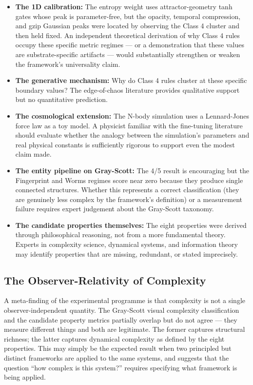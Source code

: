 \documentclass[12pt,a4paper]{article}
\begin{document}
\begin{itemize}[noitemsep]
  \item \textbf{The 1D calibration:} The entropy weight uses attractor-geometry
    tanh gates whose peak is parameter-free, but the opacity, temporal
    compression, and gzip Gaussian peaks were located by observing the
    Class 4 cluster and then held fixed.
    An independent theoretical derivation of why Class 4 rules occupy
    these specific metric regimes — or a demonstration that these values
    are substrate-specific artifacts — would substantially strengthen or
    weaken the framework's universality claim.
  \item \textbf{The generative mechanism:} Why do Class 4 rules cluster
    at these specific boundary values? The edge-of-chaos literature
    \citep{langton1990} provides qualitative support but no quantitative
    prediction.
  \item \textbf{The cosmological extension:} The N-body simulation uses
    a Lennard-Jones force law as a toy model. A physicist familiar with
    the fine-tuning literature should evaluate whether the analogy between
    the simulation's parameters and real physical constants is sufficiently
    rigorous to support even the modest claim made.
  \item \textbf{The entity pipeline on Gray-Scott:} The 4/5 result is
    encouraging but the Fingerprint and Worms regimes score near zero
    because they produce single connected structures. Whether this
    represents a correct classification (they are genuinely less complex
    by the framework's definition) or a measurement failure requires
    expert judgement about the Gray-Scott taxonomy.
  \item \textbf{The candidate properties themselves:} The eight properties were
    derived through philosophical reasoning, not from a more fundamental
    theory. Experts in complexity science, dynamical systems, and
    information theory may identify properties that are missing,
    redundant, or stated imprecisely.
\end{itemize}

\subsection{The Observer-Relativity of Complexity}

A meta-finding of the experimental programme is that complexity is not
a single observer-independent quantity.
The Gray-Scott visual complexity classification and the candidate property
metrics partially overlap but do not agree — they measure different
things and both are legitimate.
The former captures structural richness; the latter captures dynamical
complexity as defined by the eight properties.
This may simply be the expected result when two principled but distinct
frameworks are applied to the same systems, and suggests that the
question ``how complex is this system?'' requires specifying what
framework is being applied.
\end{document}
